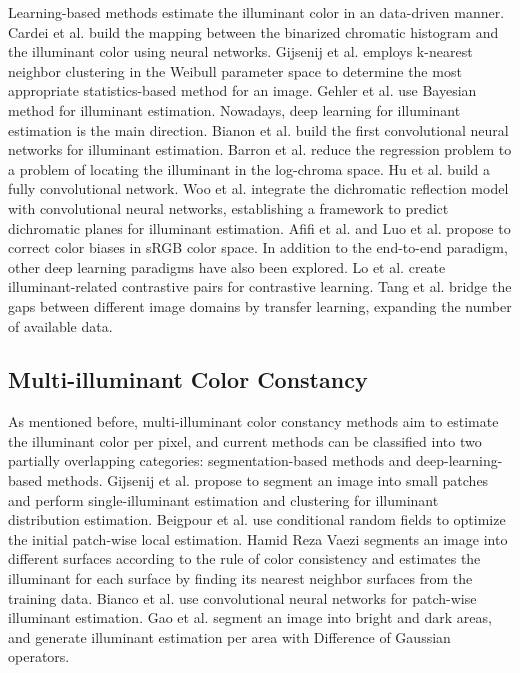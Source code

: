 Learning-based methods estimate the illuminant color in an data-driven manner. Cardei et al. \cite{cardei_estimating_2002} build the mapping between the binarized chromatic histogram and the illuminant color using neural networks. Gijsenij et al. \cite{gijsenij_color_2007} employs k-nearest neighbor clustering in the Weibull parameter space to determine the most appropriate statistics-based method for an image. Gehler et al. \cite{Gehler2008} use Bayesian method for illuminant estimation. Nowadays, deep learning for illuminant estimation is the main direction. Bianon et al. \cite{Bianco2015} build the first convolutional neural networks for illuminant estimation. Barron et al. \cite{Barron2017} reduce the regression problem to a problem of locating the illuminant in the log-chroma space. Hu et al. \cite{Hu2017} build a fully convolutional network. Woo et al. \cite{woo_deep_2021} integrate the dichromatic reflection model with convolutional neural networks, establishing a framework to predict dichromatic planes for illuminant estimation. Afifi et al. \cite{afifi_when_2019, afifi_deep_2020} and Luo et al. \cite{luo_estimating_2021} propose to correct color biases in sRGB color space. In addition to the end-to-end paradigm, other deep learning paradigms have also been explored. Lo et al. \cite{lo_clcc_2021} create illuminant-related contrastive pairs for contrastive learning. Tang et al. \cite{tang_transfer_2022} bridge the gaps between different image domains by transfer learning, expanding the number of available data.

\subsection{Multi-illuminant Color Constancy}
\label{sec2.2:Multi-illuminant Color Constancy}
As mentioned before, multi-illuminant color constancy methods aim to estimate the illuminant color per pixel, and current methods can be classified into two partially overlapping categories: segmentation-based methods and deep-learning-based methods. Gijsenij et al. \cite{gijsenij_color_2012} propose to segment an image into small patches and perform single-illuminant estimation and clustering for illuminant distribution estimation. Beigpour et al. \cite{beigpour_multi-illuminant_2014} use conditional random fields to optimize the initial patch-wise local estimation. Hamid Reza Vaezi \cite{joze_exemplar-based_2014} segments an image into different surfaces according to the rule of color consistency and estimates the illuminant for each surface by finding its nearest neighbor surfaces from the training data. Bianco et al. \cite{bianco_single_2017} use convolutional neural networks for patch-wise illuminant estimation. Gao et al. \cite{gao_combining_2019} segment an image into bright and dark areas, and generate illuminant estimation per area with Difference of Gaussian operators.

